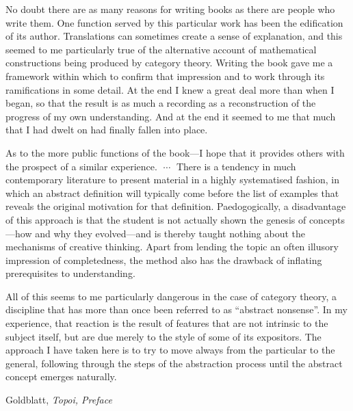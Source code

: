 \documentclass[11pt]{book}
\begin{document}
\pagebreak
\epigraph{No doubt there are as many reasons for writing books as there are people
who write them. One function served by this particular work has been the
edification of its author. Translations can sometimes create a sense of
explanation, and this seemed to me particularly true of the alternative
account of mathematical constructions being produced by category
theory. Writing the book gave me a framework within which to confirm
that impression and to work through its ramifications in some detail. At
the end I knew a great deal more than when I began, so that the result is
as much a recording as a reconstruction of the progress of my own
understanding. And at the end it seemed to me that much that I had
dwelt on had finally fallen into place.
\par
As to the more public functions of the book---I hope that it provides
others with the prospect of a similar experience. 
$\;\cdots\;$ 
There is a tendency in much contemporary literature to present material
in a highly systematised fashion, in which an abstract definition will
typically come before the list of examples that reveals the original
motivation for that definition. Paedogogically, a disadvantage of this
approach is that the student is not actually shown the genesis of 
concepts---how and why they evolved---and 
is thereby taught nothing about the
mechanisms of creative thinking. Apart from lending the topic an often
illusory impression of completedness, the method also has the drawback
of inflating prerequisites to understanding.
\par
All of this seems to me particularly dangerous in the case of category
theory, a discipline that has more than once been referred to as ``abstract
nonsense''. In my experience, that reaction is the result of features that
are not intrinsic to the subject itself, but are due merely to the style of
some of its expositors. The approach I have taken here is to try to move
always from the particular to the general, following through the steps of
the abstraction process until the abstract concept emerges naturally. 
}
{Goldblatt, \textit{Topoi, Preface}~\cite{goldblatt_1984_topoi}}
\setcounter{currentlevel}{\value{baseSectionLevel}}
\label{sec:Preface-2020-08}
\end{document}
